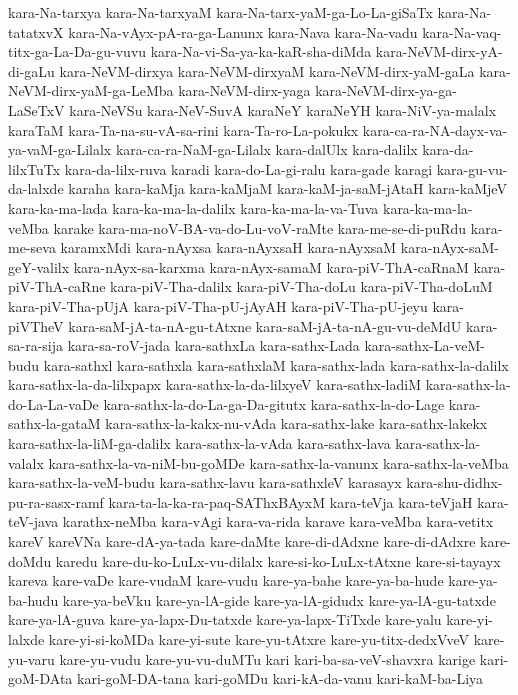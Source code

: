 {kara-Na-tarxya
kara-Na-tarxyaM
kara-Na-tarx-yaM-ga-Lo-La-giSaTx
kara-Na-tatatxvX
kara-Na-vAyx-pA-ra-ga-Lanunx
kara-Nava
kara-Na-vadu
kara-Na-vaq-titx-ga-La-Da-gu-vuvu
kara-Na-vi-Sa-ya-ka-kaR-sha-diMda
kara-NeVM-dirx-yA-di-gaLu
kara-NeVM-dirxya
kara-NeVM-dirxyaM
kara-NeVM-dirx-yaM-gaLa
kara-NeVM-dirx-yaM-ga-LeMba
kara-NeVM-dirx-yaga
kara-NeVM-dirx-ya-ga-LaSeTxV
kara-NeVSu
kara-NeV-SuvA
karaNeY
karaNeYH
kara-NiV-ya-malalx
karaTaM
kara-Ta-na-su-vA-sa-rini
kara-Ta-ro-La-pokukx
kara-ca-ra-NA-dayx-va-ya-vaM-ga-Lilalx
kara-ca-ra-NaM-ga-Lilalx
kara-dalUlx
kara-dalilx
kara-da-lilxTuTx
kara-da-lilx-ruva
karadi
kara-do-La-gi-ralu
kara-gade
karagi
kara-gu-vu-da-lalxde
karaha
kara-kaMja
kara-kaMjaM
kara-kaM-ja-saM-jAtaH
kara-kaMjeV
kara-ka-ma-lada
kara-ka-ma-la-dalilx
kara-ka-ma-la-va-Tuva
kara-ka-ma-la-veMba
karake
kara-ma-noV-BA-va-do-Lu-voV-raMte
kara-me-se-di-puRdu
kara-me-seva
karamxMdi
kara-nAyxsa
kara-nAyxsaH
kara-nAyxsaM
kara-nAyx-saM-geY-valilx
kara-nAyx-sa-karxma
kara-nAyx-samaM
kara-piV-ThA-caRnaM
kara-piV-ThA-caRne
kara-piV-Tha-dalilx
kara-piV-Tha-doLu
kara-piV-Tha-doLuM
kara-piV-Tha-pUjA
kara-piV-Tha-pU-jAyAH
kara-piV-Tha-pU-jeyu
kara-piVTheV
kara-saM-jA-ta-nA-gu-tAtxne
kara-saM-jA-ta-nA-gu-vu-deMdU
kara-sa-ra-sija
kara-sa-roV-jada
kara-sathxLa
kara-sathx-Lada
kara-sathx-La-veM-budu
kara-sathxl
kara-sathxla
kara-sathxlaM
kara-sathx-lada
kara-sathx-la-dalilx
kara-sathx-la-da-lilxpapx
kara-sathx-la-da-lilxyeV
kara-sathx-ladiM
kara-sathx-la-do-La-La-vaDe
kara-sathx-la-do-La-ga-Da-gitutx
kara-sathx-la-do-Lage
kara-sathx-la-gataM
kara-sathx-la-kakx-nu-vAda
kara-sathx-lake
kara-sathx-lakekx
kara-sathx-la-liM-ga-dalilx
kara-sathx-la-vAda
kara-sathx-lava
kara-sathx-la-valalx
kara-sathx-la-va-niM-bu-goMDe
kara-sathx-la-vanunx
kara-sathx-la-veMba
kara-sathx-la-veM-budu
kara-sathx-lavu
kara-sathxleV
karasayx
kara-shu-didhx-pu-ra-sasx-ramf
kara-ta-la-ka-ra-paq-SAThxBAyxM
kara-teVja
kara-teVjaH
kara-teV-java
karathx-neMba
kara-vAgi
kara-va-rida
karave
kara-veMba
kara-vetitx
kareV
kareVNa
kare-dA-ya-tada
kare-daMte
kare-di-dAdxne
kare-di-dAdxre
kare-doMdu
karedu
kare-du-ko-LuLx-vu-dilalx
kare-si-ko-LuLx-tAtxne
kare-si-tayayx
kareva
kare-vaDe
kare-vudaM
kare-vudu
kare-ya-bahe
kare-ya-ba-hude
kare-ya-ba-hudu
kare-ya-beVku
kare-ya-lA-gide
kare-ya-lA-gidudx
kare-ya-lA-gu-tatxde
kare-ya-lA-guva
kare-ya-lapx-Du-tatxde
kare-ya-lapx-TiTxde
kare-yalu
kare-yi-lalxde
kare-yi-si-koMDa
kare-yi-sute
kare-yu-tAtxre
kare-yu-titx-dedxVveV
kare-yu-varu
kare-yu-vudu
kare-yu-vu-duMTu
kari
kari-ba-sa-veV-shavxra
karige
kari-goM-DAta
kari-goM-DA-tana
kari-goMDu
kari-kA-da-vanu
kari-kaM-ba-Liya
}
